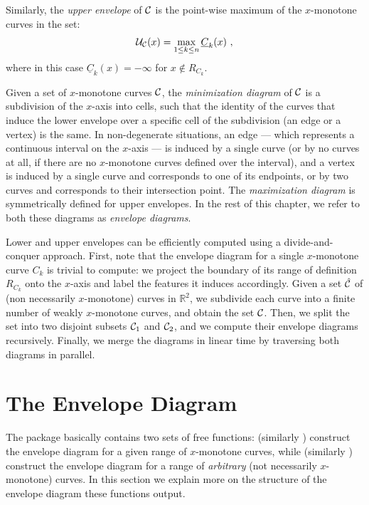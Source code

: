 Similarly, the {\em upper envelope} of ${\cal C}$ is the point-wise maximum of
the $x$-monotone curves in the set:
\begin{eqnarray*}
{\cal U}_{{\cal C}} (x) = \max_{1 \leq k \leq n}{\underline{C}_k (x)} \ ,
\end{eqnarray*}
where in this case $\underline{C}_k(x) = -\infty$ for $x 
\not\in R_{C_k}$.

Given a set of $x$-monotone curves ${\cal C}$, the {\em minimization
diagram} of ${\cal C}$ is a subdivision of the $x$-axis into cells,
such that the identity of the curves that induce the lower envelope
over a specific cell of the subdivision (an edge or a vertex) is the
same. In non-degenerate situations, an edge --- which represents a
continuous interval on the $x$-axis --- is induced by a single
curve (or by no curves at all, if there are no $x$-monotone curves
defined over the interval), and a vertex is induced by a single curve
and corresponds to one of its endpoints, or by two curves and
corresponds to their intersection point.
The {\em maximization diagram} is symmetrically defined for upper envelopes.
In the rest of this chapter, we refer to both these diagrams as
{\em envelope diagrams}.

Lower and upper envelopes can be efficiently computed using a
divide-and-conquer approach. First, note that the envelope diagram for
a single $x$-monotone curve $C_k$ is trivial to compute: we project
the boundary of its range of definition $R_{C_k}$ onto the $x$-axis
and label the features it induces accordingly. Given a set
$\hat{{\cal C}}$ of (non necessarily $x$-monotone) curves in ${\mathbb R}^2$,
we subdivide each curve into a finite number of weakly $x$-monotone 
curves, and obtain the set ${\cal C}$. Then, we split the set into two
disjoint subsets ${\cal C}_1$ and ${\cal C}_2$, and we compute their envelope
diagrams recursively. Finally, we merge the diagrams in linear time by
traversing both diagrams in parallel.

\section{The Envelope Diagram\label{env2_sec:env_diag}}

The package basically contains two sets of free functions:
 (similarly
 ) construct the envelope diagram
for a given range of $x$-monotone curves, while 
 (similarly
) construct the envelope diagram for a
range of {\em arbitrary} (not necessarily $x$-monotone) curves.
In this section we explain more on the structure of the envelope
diagram these functions output.


